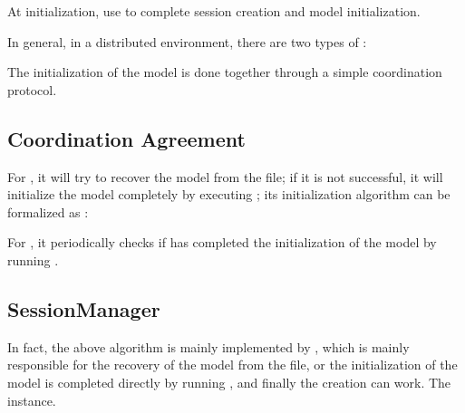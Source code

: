 \begin{content}

 At initialization, use  to complete session creation and model initialization.

In general, in a distributed environment, there are two types of :

\begin{enum}
\end{enum}

The initialization of the model is done together through a simple coordination protocol.

\subsection{Coordination Agreement}

For , it will try to recover the model from the  file; if it is not successful, it will initialize the model completely by executing ; its initialization algorithm can be formalized as :


For , it periodically checks if  has completed the initialization of the model by running .


\subsection{SessionManager}

In fact, the above algorithm is mainly implemented by , which is mainly responsible for the recovery of the model from the  file, or the initialization of the model is completed directly by running , and finally the creation can work. The  instance.


\end{content}
